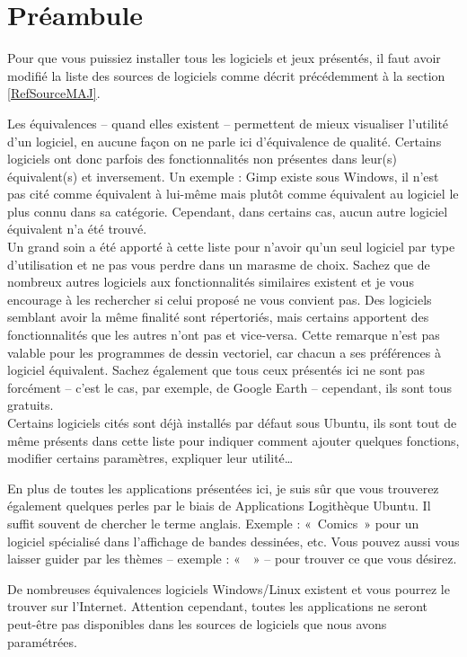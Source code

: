 \section{Préambule}
Pour que vous puissiez installer tous les logiciels et jeux présentés,  il faut avoir modifié la liste des sources de logiciels comme décrit précédemment à la section \ref{RefSourceMAJ}.\par
Les équivalences -- quand elles existent -- permettent de mieux visualiser l'utilité d'un logiciel, en aucune façon on ne parle ici d'équivalence de qualité. Certains logiciels ont donc parfois des fonctionnalités non présentes dans leur(s) équivalent(s) et inversement. Un exemple : Gimp existe sous Windows, il n'est pas cité comme équivalent à lui-même mais plutôt comme équivalent au logiciel le plus connu dans sa catégorie. Cependant, dans certains cas, aucun autre logiciel équivalent n'a été trouvé.\\
Un grand soin a été apporté à cette liste pour n'avoir qu'un seul logiciel par type d'utilisation et ne pas vous perdre dans un marasme de choix. Sachez que de nombreux autres logiciels aux fonctionnalités similaires existent et je vous encourage à les rechercher si celui proposé ne vous convient pas. Des logiciels semblant avoir la même finalité sont répertoriés, mais certains apportent des fonctionnalités que les autres n'ont pas et vice-versa. Cette remarque n'est pas valable pour les programmes de dessin vectoriel, car chacun a ses préférences à logiciel équivalent. Sachez également que tous ceux présentés ici ne sont pas forcément  -- c'est le cas, par exemple, de Google Earth -- cependant, ils sont tous gratuits.\\
Certains logiciels cités sont déjà installés par défaut sous Ubuntu, ils sont tout de même présents dans cette liste pour indiquer comment ajouter quelques fonctions, modifier certains paramètres, expliquer leur utilité\ldots{}\par
En plus de toutes les applications présentées ici, je suis sûr que vous trouverez également quelques perles par le biais de Applications \FlecheDroite Logithèque Ubuntu. Il suffit souvent de chercher le terme anglais. Exemple : «~Comics~» pour un logiciel spécialisé dans l'affichage de bandes dessinées, etc. Vous pouvez aussi vous laisser guider par les thèmes -- exemple : «~~» -- pour trouver ce que vous désirez.\par
\begin{nota}
De nombreuses équivalences logiciels Windows/Linux existent et vous pourrez le trouver sur l'Internet. Attention cependant, toutes les applications ne seront peut-être pas disponibles dans les sources de logiciels que nous avons paramétrées.
\end{nota}
